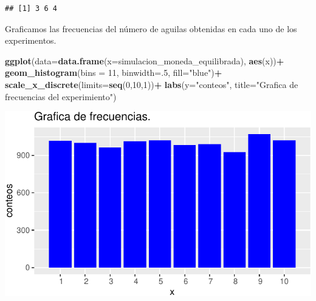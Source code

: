 \documentclass[11pt,]{article}
\newenvironment{Shaded}{\begin{snugshade}}{\end{snugshade}}
\newcommand{\DataTypeTok}[1]{\textcolor[rgb]{0.13,0.29,0.53}{#1}}
\newcommand{\DecValTok}[1]{\textcolor[rgb]{0.00,0.00,0.81}{#1}}
\newcommand{\KeywordTok}[1]{\textcolor[rgb]{0.13,0.29,0.53}{\textbf{#1}}}
\newcommand{\NormalTok}[1]{#1}
\newcommand{\OperatorTok}[1]{\textcolor[rgb]{0.81,0.36,0.00}{\textbf{#1}}}
\newcommand{\StringTok}[1]{\textcolor[rgb]{0.31,0.60,0.02}{#1}}
\begin{document}
\begin{verbatim}
## [1] 3 6 4
\end{verbatim}

Graficamos las frecuencias del número de aguilas obtenidas en cada uno
de los experimentos.

\begin{Shaded}
\begin{Highlighting}[]
\KeywordTok{ggplot}\NormalTok{(}\DataTypeTok{data=}\KeywordTok{data.frame}\NormalTok{(}\DataTypeTok{x=}\NormalTok{simulacion_moneda_equilibrada), }\KeywordTok{aes}\NormalTok{(x))}\OperatorTok{+}
\StringTok{  }\KeywordTok{geom_histogram}\NormalTok{(}\DataTypeTok{bins =} \DecValTok{11}\NormalTok{, }\DataTypeTok{binwidth=}\NormalTok{.}\DecValTok{5}\NormalTok{, }\DataTypeTok{fill=}\StringTok{"blue"}\NormalTok{)}\OperatorTok{+}
\StringTok{  }\KeywordTok{scale_x_discrete}\NormalTok{(}\DataTypeTok{limits=}\KeywordTok{seq}\NormalTok{(}\DecValTok{0}\NormalTok{,}\DecValTok{10}\NormalTok{,}\DecValTok{1}\NormalTok{))}\OperatorTok{+}
\StringTok{  }\KeywordTok{labs}\NormalTok{(}\DataTypeTok{y=}\StringTok{"conteos"}\NormalTok{, }\DataTypeTok{title=}\StringTok{"Grafica de frecuencias del experimiento"}\NormalTok{)}
\end{Highlighting}
\end{Shaded}

\begin{center}\includegraphics{Tarea_1_files/figure-latex/unnamed-chunk-8-1} \end{center}
\end{document}

